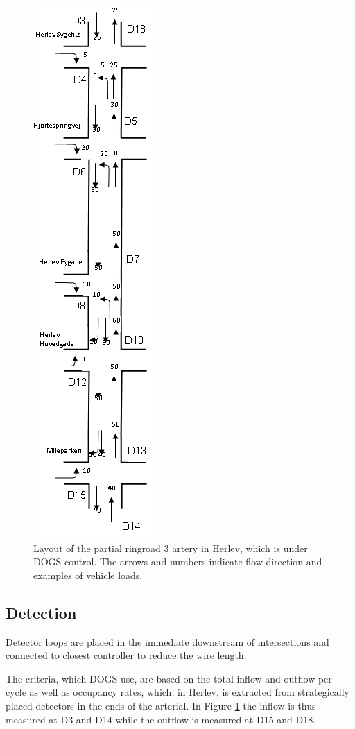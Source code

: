 \begin{figure}[!ht]
\centering
\includegraphics[scale=0.5]{dogs_herlev.png} 
\caption{Layout of the partial ringroad 3 artery in Herlev, which is under DOGS control. The arrows and numbers indicate flow direction and examples of vehicle loads.}
\label{fig:dogs_herlev}
\end{figure}

\subsection{Detection}
Detector loops are placed in the immediate downstream of intersections and connected to closest controller to reduce the wire length. 

The criteria, which DOGS use, are based on the total inflow and outflow per cycle as well as occupancy rates, which, in Herlev, is extracted from strategically placed detectors in the ends of the arterial. In Figure \ref{fig:dogs_herlev} the inflow is thus measured at D3 and D14 while the outflow is measured at D15 and D18. 

